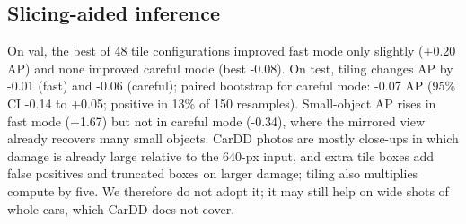 \documentclass[10pt,twocolumn]{article}
\begin{document}
\subsection{Slicing-aided inference}
\begin{table}[t]\centering\small\caption{Tiled inference (2$\times$2, 25\% overlap) fused with the full-image detections; fusion rule, maximum tile-box area and tile-score weight chosen on val.}\end{table}
On val, the best of 48 tile configurations improved fast mode only slightly (+0.20 AP) and none improved careful mode (best -0.08). On test, tiling changes AP by -0.01 (fast) and -0.06 (careful); paired bootstrap for careful mode: -0.07 AP (95\% CI -0.14 to +0.05; positive in 13\% of 150 resamples). Small-object AP rises in fast mode (+1.67) but not in careful mode (-0.34), where the mirrored view already recovers many small objects. CarDD photos are mostly close-ups in which damage is already large relative to the 640-px input, and extra tile boxes add false positives and truncated boxes on larger damage; tiling also multiplies compute by five. We therefore do not adopt it; it may still help on wide shots of whole cars, which CarDD does not cover.
\end{document}
